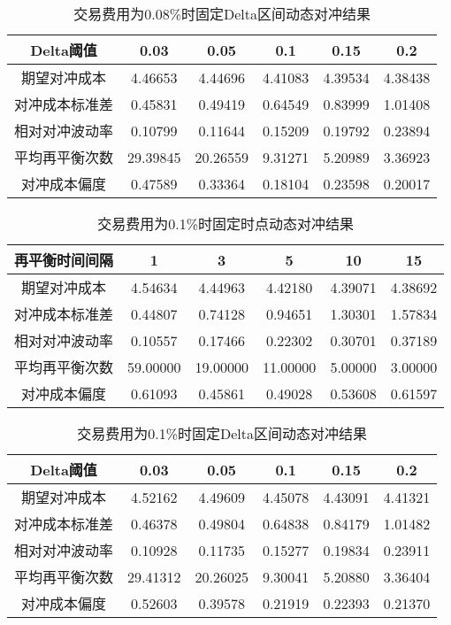 \begin{table}[htbp]
  \centering
  \caption{交易费用为0.08\%时固定Delta区间动态对冲结果}
  \label{tab:fixed_interval_0.08}
  \begin{tabular}{cccccc}
    \toprule
    Delta阈值 & 0.03 & 0.05 & 0.1 & 0.15 & 0.2 \\
    \midrule
    期望对冲成本 & 4.46653 & 4.44696 & 4.41083 & 4.39534 & 4.38438 \\
    对冲成本标准差 & 0.45831 & 0.49419 & 0.64549 & 0.83999 & 1.01408 \\
    相对对冲波动率 & 0.10799 & 0.11644 & 0.15209 & 0.19792 & 0.23894 \\
    平均再平衡次数 & 29.39845 & 20.26559 & 9.31271 & 5.20989 & 3.36923 \\
    对冲成本偏度 & 0.47589 & 0.33364 & 0.18104 & 0.23598 & 0.20017 \\
    \bottomrule
  \end{tabular}
\end{table}

\begin{table}[htbp]
  \centering
  \caption{交易费用为0.1\%时固定时点动态对冲结果}
  \label{tab:fixed_time_0.1}
  \begin{tabular}{cccccc}
    \toprule
    再平衡时间间隔 & 1 & 3 & 5 & 10 & 15 \\
    \midrule
    期望对冲成本 & 4.54634 & 4.44963 & 4.42180 & 4.39071 & 4.38692 \\
    对冲成本标准差 & 0.44807 & 0.74128 & 0.94651 & 1.30301 & 1.57834 \\
    相对对冲波动率 & 0.10557 & 0.17466 & 0.22302 & 0.30701 & 0.37189 \\
    平均再平衡次数 & 59.00000 & 19.00000 & 11.00000 & 5.00000 & 3.00000 \\
    对冲成本偏度 & 0.61093 & 0.45861 & 0.49028 & 0.53608 & 0.61597 \\
    \bottomrule
  \end{tabular}
\end{table}

\begin{table}[htbp]
  \centering
  \caption{交易费用为0.1\%时固定Delta区间动态对冲结果}
  \label{tab:fixed_interval_0.1}
  \begin{tabular}{cccccc}
    \toprule
    Delta阈值 & 0.03 & 0.05 & 0.1 & 0.15 & 0.2 \\
    \midrule
    期望对冲成本 & 4.52162 & 4.49609 & 4.45078 & 4.43091 & 4.41321 \\
    对冲成本标准差 & 0.46378 & 0.49804 & 0.64838 & 0.84179 & 1.01482 \\
    相对对冲波动率 & 0.10928 & 0.11735 & 0.15277 & 0.19834 & 0.23911 \\
    平均再平衡次数 & 29.41312 & 20.26025 & 9.30041 & 5.20880 & 3.36404 \\
    对冲成本偏度 & 0.52603 & 0.39578 & 0.21919 & 0.22393 & 0.21370 \\
    \bottomrule
  \end{tabular}
\end{table}
